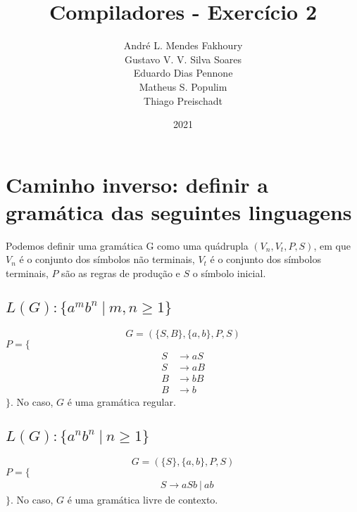 \documentclass{article}
\title{Compiladores - Exercício 2}
\author{André L. Mendes Fakhoury\\
Gustavo V. V. Silva Soares\\
Eduardo Dias Pennone\\
Matheus S. Populim\\
Thiago Preischadt\\
}
\date{2021}
\begin{document}
\maketitle

\section{Caminho inverso: definir a gramática das seguintes linguagens}

Podemos definir uma gramática G como uma quádrupla $(V_n, V_t, P, S)$, em que $V_n$ é o conjunto dos símbolos não terminais, $V_t$ é o conjunto dos símbolos terminais, $P$ são as regras de produção e $S$ o símbolo inicial.

\subsection{$L(G): \{a^mb^n\ |\ m, n \geq 1\}$}

$$G = (\{S, B\}, \{a, b\}, P, S)$$
$P = \{$
\begin{align*}
S &\rightarrow aS\\
S &\rightarrow aB\\
B &\rightarrow bB\\
B &\rightarrow b
\end{align*}
$\}$. No caso, $G$ é uma gramática regular.

\subsection{$L(G): \{a^nb^n\ |\ n \geq 1\}$}


$$G = (\{S\}, \{a, b\}, P, S)$$
$P = \{$
\begin{align*}
& S \rightarrow aSb\ |\ ab
\end{align*}
$\}$. No caso, $G$ é uma gramática livre de contexto.
\end{document}

